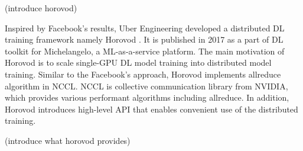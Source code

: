 (introduce horovod)

Inspired by Facebook's results, Uber Engineering developed a distributed DL
training framework namely Horovod \cite{sergeev2018horovod}. It is published in
2017 as a part of DL toolkit for Michelangelo, a ML-as-a-service platform.
The main motivation of Horovod is to scale single-GPU DL model training
into distributed model training. Similar to the Facebook's approach,
Horovod implements allreduce algorithm in NCCL. NCCL is collective communication
library from NVIDIA, which provides various performant algorithms including
allreduce. In addition, Horovod introduces high-level API that enables
convenient use of the distributed training.  

(introduce what horovod provides)
